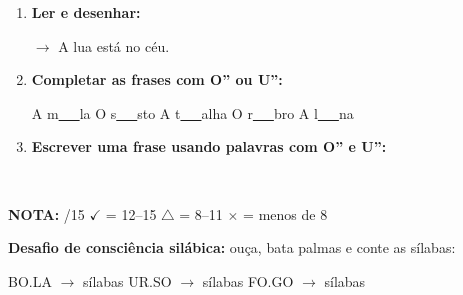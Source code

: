 \begin{exercicio}
\begin{enumerate}[resume]
  \item \textbf{Ler e desenhar:}
  \begin{center}
  $\rightarrow$ A lua está no céu.
  \end{center}
  \begin{center}
  \end{center}

  \item \textbf{Completar as frases com O'' ou U'':}
  \begin{center}
  A m\underline{~~~}la \quad O s\underline{~~~}sto \quad A t\underline{~~~}alha \quad O r\underline{~~~}bro \quad A l\underline{~~~}na
  \end{center}

  \item \textbf{Escrever uma frase usando palavras com O'' e U'':}
  \begin{center}
  \underline{\hspace{12cm}} \\
  \underline{\hspace{12cm}}
  \end{center}
\end{enumerate}

\noindent\textbf{NOTA:} \underline{\hspace{1cm}}/15 \quad $\checkmark$ = 12--15 \quad $\triangle$ = 8--11 \quad $\times$ = menos de 8
\end{exercicio}

\begin{somsilaba}[title={\faMusic~Som das S\'ilabas --- B\^onus (n\~ao vale nota)}]
\textbf{Desafio de consci\^encia sil\'abica:} ou\c{c}a, bata palmas e conte as s\'ilabas:
\begin{center}
BO.LA $\rightarrow$ \underline{\hspace{1cm}} s\'ilabas \quad UR.SO $\rightarrow$ \underline{\hspace{1cm}} s\'ilabas \quad FO.GO $\rightarrow$ \underline{\hspace{1cm}} s\'ilabas
\end{center}
\end{somsilaba}



